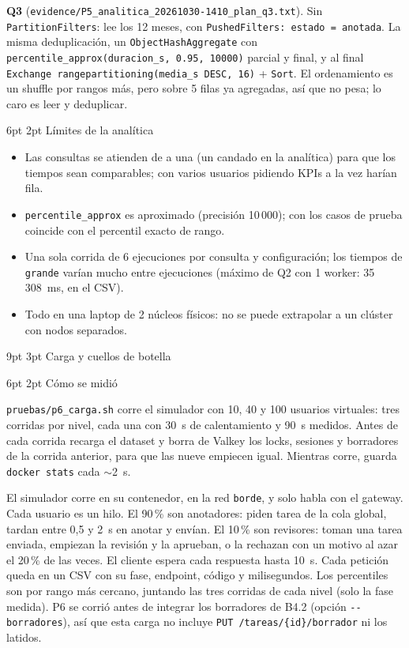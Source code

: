 \documentclass[10pt,letterpaper]{article}
\makeatletter
\newcommand{\ev}[1]{{\footnotesize\texttt{evidence/\allowbreak #1}}}
\renewcommand\section{\@startsection{section}{1}{\z@}%
  {9pt \@plus 2pt \@minus 1pt}{3pt}%
  {\normalfont\large\bfseries\color{acc}}}
\renewcommand\subsection{\@startsection{subsection}{2}{\z@}%
  {6pt \@plus 1pt}{2pt}%
  {\normalfont\normalsize\bfseries\color{acc}}}
\makeatother
\begin{document}
\textbf{Q3} (\ev{P5\_analitica\_20261030-1410\_plan\_q3.txt}). Sin \texttt{PartitionFilters}: lee los 12
meses, con \texttt{PushedFilters: estado = anotada}. La misma deduplicación, un
\texttt{ObjectHashAggregate} con \texttt{percentile\_approx(duracion\_s, 0.95, 10000)} parcial y final, y al
final \texttt{Exchange rangepartitioning(media\_s DESC, 16)} + \texttt{Sort}. El ordenamiento es un shuffle
por rangos más, pero sobre 5 filas ya agregadas, así que no pesa; lo caro es leer y deduplicar.

\subsection{Límites de la analítica}

\begin{itemize}\setlength{\itemsep}{1pt}
\item Las consultas se atienden de a una (un candado en la analítica) para que los tiempos sean comparables;
con varios usuarios pidiendo KPIs a la vez harían fila.
\item \texttt{percentile\_approx} es aproximado (precisión 10\,000); con los casos de prueba coincide con el
percentil exacto de rango.
\item Una sola corrida de 6 ejecuciones por consulta y configuración; los tiempos de \texttt{grande} varían
mucho entre ejecuciones (máximo de Q2 con 1 worker: 35\,308~ms, en el CSV).
\item Todo en una laptop de 2 núcleos físicos: no se puede extrapolar a un clúster con nodos separados.
\end{itemize}

\section{Carga y cuellos de botella}

\subsection{Cómo se midió}

\texttt{pruebas/p6\_carga.sh} corre el simulador con 10, 40 y 100 usuarios virtuales: tres corridas por
nivel, cada una con 30~s de calentamiento y 90~s medidos. Antes de cada corrida recarga el dataset y borra
de Valkey los locks, sesiones y borradores de la corrida anterior, para que las nueve empiecen igual.
Mientras corre, guarda \texttt{docker stats} cada $\sim$2~s.

El simulador corre en su contenedor, en la red \texttt{borde}, y solo habla con el gateway. Cada usuario es
un hilo. El 90\,\% son anotadores: piden tarea de la cola global, tardan entre 0,5 y 2~s en anotar y
envían. El 10\,\% son revisores: toman una tarea enviada, empiezan la revisión y la aprueban, o la rechazan
con un motivo al azar el 20\,\% de las veces. El cliente espera cada respuesta hasta 10~s. Cada petición
queda en un CSV con su fase, endpoint, código y milisegundos. Los percentiles son por rango más cercano,
juntando las tres corridas de cada nivel (solo la fase medida). P6 se corrió antes de integrar los
borradores de B4.2 (opción \texttt{-{}-borradores}), así que esta carga no incluye
\texttt{PUT /tareas/\{id\}/borrador} ni los latidos.
\end{document}
